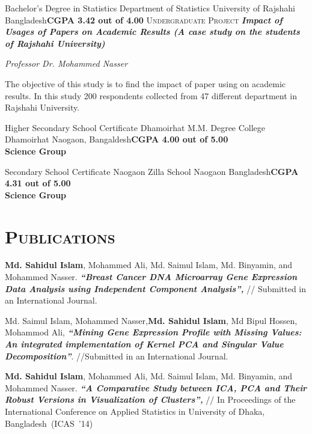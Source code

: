 \documentclass[10pt,a4paper]{moderncv}
\begin{document}
	{Bachelor's Degree in Statistics}
	{Department of Statistics}
	{University of Rajshahi}
	{Bangladesh}{\textbf{CGPA 3.42 out of 4.00}}
	\cvitem{---}
	{\textsc{Undergraduate Project}}
	{\emph{\textbf{Impact of Usages of Papers on Academic Results (A case study on the students of Rajshahi University)}}
	}
	
		{\emph{Professor Dr. Mohammed Nasser}
		}
		
	{\small The objective of this study is to find the impact of paper using on academic results. In this study 200 respondents collected from 47 different department in Rajshahi University.}
	
	
	{Higher Secondary School Certificate}
	{\newline Dhamoirhat M.M. Degree College}
	{Dhamoirhat}
	{Naogaon, Bangaldesh}{\textbf {CGPA 4.00 out of 5.00 \\Science Group}}
	
	{Secondary School Certificate}
	{\newline Naogaon Zilla School}
	{Naogaon}
	{Bangladesh}{\textbf{CGPA 4.31 out of 5.00 \\Science Group}}
	
		\section{\textsc{Publications}}
		
		{\textbf{Md. Sahidul Islam}, Mohammed Ali, Md. Saimul Islam, Md. Binyamin, and Mohammed Nasser.
		\textbf{\textit{“Breast Cancer DNA Microarray Gene Expression Data Analysis using Independent Component Analysis”,}}
		// Submitted in an International Journal.}

		{Md.  Saimul Islam, Mohammed Nasser,\textbf{Md. Sahidul Islam}, Md Bipul Hossen, Mohammod Ali, \textbf{\textit {“Mining Gene Expression Profile with Missing Values: An integrated implementation of Kernel PCA and Singular Value Decomposition”}}. //Submitted in an International Journal.}
		
		{\textbf{Md. Sahidul Islam}, Mohammed Ali, Md. Saimul Islam, Md. Binyamin, and Mohammed Nasser.
		\textbf{\textit{“A Comparative Study between ICA, PCA and Their Robust Versions in Visualization of Clusters”,}}
			// In Proceedings of the International Conference on Applied Statistics in University of Dhaka, Bangladesh~(ICAS~'14)}
		
\end{document}
